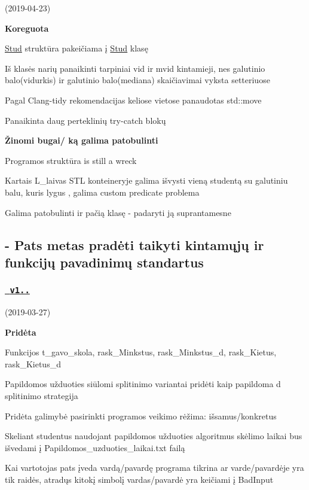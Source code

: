 (2019-\/04-\/23)

{\bfseries{Koreguota}}
\begin{DoxyItemize}
\item {\ttfamily \mbox{\hyperlink{class_stud}{Stud}}} struktūra pakeičiama į {\ttfamily \mbox{\hyperlink{class_stud}{Stud}}} klasę
\item Iš klasės narių panaikinti tarpiniai {\ttfamily vid} ir {\ttfamily mvid} kintamieji, nes galutinio balo(vidurkis) ir galutinio balo(mediana) skaičiavimai vyksta setteriuose
\item Pagal {\ttfamily Clang-\/tidy} rekomendacijas keliose vietose panaudotas {\ttfamily std\+::move}
\item Panaikinta daug perteklinių try-\/catch blokų
\end{DoxyItemize}

{\bfseries{Žinomi bugai/ ką galima patobulinti}}
\begin{DoxyItemize}
\item Programos struktūra is still a wreck
\item Kartais {\ttfamily L\+\_\+laivas} S\+TL konteineryje galima išvysti vieną studentą su galutiniu balu, kuris lygus {}, galima custom predicate problema
\item Galima patobulinti ir pačią klasę -\/ padaryti ją suprantamesne \subsection*{-\/ Pats metas pradėti taikyti kintamųjų ir funkcijų pavadinimų standartus }
\end{DoxyItemize}

\subsubsection*{\href{https://github.com/gitguuddd/Obj_Duomenu_apdorojimas/releases/tag/v1.0.1}{\texttt{ v1..}}}

(2019-\/03-\/27)

{\bfseries{Pridėta}}
\begin{DoxyItemize}
\item Funkcijos {\ttfamily t\+\_\+gavo\+\_\+skola, rask\+\_\+\+Minkstus, rask\+\_\+\+Minkstus\+\_\+d, rask\+\_\+\+Kietus, rask\+\_\+\+Kietus\+\_\+d}
\item Papildomos užduoties siūlomi splitinimo variantai pridėti kaip papildoma {\ttfamily d} splitinimo strategija
\item Pridėta galimybė pasirinkti programos veikimo rėžima\+: išsamus/konkretus
\item Skeliant studentus naudojant papildomos užduoties algoritmus skėlimo laikai bus išvedami į {\ttfamily Papildomos\+\_\+uzduoties\+\_\+laikai.\+txt} failą
\item Kai vartotojas pats įveda vardą/pavardę programa tikrina ar varde/pavardėje yra tik raidės, atradųs kitokį simbolį vardas/pavardė yra keičiami į {\ttfamily Bad\+Input}
\end{DoxyItemize}

